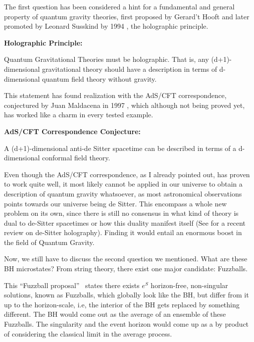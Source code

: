 \documentclass[11pt,a4paper]{article}
\begin{document}
The first question has been considered a hint for a fundamental and general property of quantum gravity theories, first proposed by Gerard't Hooft and later promoted by Leonard Susskind by 1994 \cite{Susskind_1995}, the holographic principle.

\begin{boxedminipage}{0.9\textwidth}
    \textbf{Holographic Principle: }
    
    Quantum Gravitational Theories must be holographic. That is, any (d+1)-dimensional gravitational theory should have a description in terms of d-dimensional quantum field theory without gravity.
\end{boxedminipage}

This statement has found realization with the AdS/CFT correspondence, conjectured by Juan Maldacena in 1997 \cite{Maldacena_1999}, which although not being proved yet, has worked like a charm in every tested example.

\begin{boxedminipage}{0.9\textwidth}
    \textbf{AdS/CFT Correspondence Conjecture: }
    
    A (d+1)-dimensional anti-de Sitter spacetime can be described in terms of a d-dimensional conformal field theory.
\end{boxedminipage}

Even though the AdS/CFT correspondence, as I already pointed out, has proven to work quite well, it most likely cannot be applied in our universe to obtain a description of quantum gravity whatsoever, as most astronomical observations points towards our universe being de Sitter. This encompass a whole new problem on its own, since there is still no consensus in what kind of theory is dual to de-Sitter spacetimes or how this duality manifest itself (See \cite{Galante:2023uyf} for a recent review on de-Sitter holography). Finding it would entail an enormous boost in the field of Quantum Gravity.

Now, we still have to discuss the second question we mentioned. What are these BH microstates? From string theory, there exist one major candidate: Fuzzballs. 

This \textquotedblleft Fuzzball proposal\textquotedblright~ states there exists $e^{S}$ horizon-free, non-singular solutions, known as Fuzzballs, which globally look like the BH, but differ from it up to the horizon-scale, i.e, the interior of the BH gets replaced by something different. The BH would come out as the average of an ensemble of these Fuzzballs. The singularity and the event horizon would come up as a by product of considering the classical limit in the average process.
\end{document}
